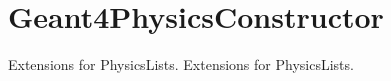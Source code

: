 \hypertarget{group___geant4_physics_constructor}{
\section{Geant4PhysicsConstructor}
\label{group___geant4_physics_constructor}
}


Extensions for PhysicsLists.  
Extensions for PhysicsLists. 